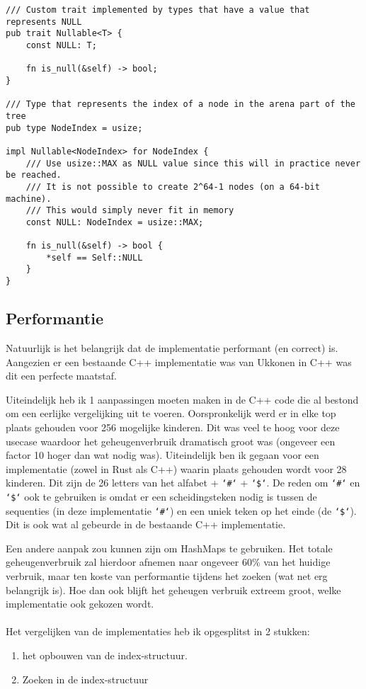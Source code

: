 \begin{verbatim}
/// Custom trait implemented by types that have a value that represents NULL
pub trait Nullable<T> {
    const NULL: T;

    fn is_null(&self) -> bool;
}

/// Type that represents the index of a node in the arena part of the tree
pub type NodeIndex = usize;

impl Nullable<NodeIndex> for NodeIndex {
    /// Use usize::MAX as NULL value since this will in practice never be reached.
    /// It is not possible to create 2^64-1 nodes (on a 64-bit machine).
    /// This would simply never fit in memory
    const NULL: NodeIndex = usize::MAX;

    fn is_null(&self) -> bool {
        *self == Self::NULL
    }
}
\end{verbatim}

\subsection{Performantie}\label{subsec:performantie}
Natuurlijk is het belangrijk dat de implementatie performant (en correct) is.
Aangezien er een bestaande C++ implementatie was van Ukkonen in C++ was dit een perfecte maatstaf.

Uiteindelijk heb ik 1 aanpassingen moeten maken in de C++ code die al bestond om een eerlijke vergelijking uit te voeren.
Oorspronkelijk werd er in elke top plaats gehouden voor 256 mogelijke kinderen.
Dit was veel te hoog voor deze usecase waardoor het geheugenverbruik dramatisch groot was (ongeveer een factor 10 hoger dan wat nodig was).
Uiteindelijk ben ik gegaan voor een implementatie (zowel in Rust als C++) waarin plaats gehouden wordt voor 28 kinderen.
Dit zijn de 26 letters van het alfabet + \texttt{`\#`} + \texttt{`\$`}.
De reden om \texttt{`\#`} en \texttt{`\$`} ook te gebruiken is omdat er een scheidingsteken nodig is tussen de sequenties (in deze implementatie \texttt{`\#`}) en een uniek teken op het einde (de \texttt{`\$`}).
Dit is ook wat al gebeurde in de bestaande C++ implementatie.

Een andere aanpak zou kunnen zijn om HashMaps te gebruiken.
Het totale geheugenverbruik zal hierdoor afnemen naar ongeveer 60\% van het huidige verbruik, maar ten koste van performantie tijdens het zoeken (wat net erg belangrijk is).
Hoe dan ook blijft het geheugen verbruik extreem groot, welke implementatie ook gekozen wordt.
\\ \\
Het vergelijken van de implementaties heb ik opgesplitst in 2 stukken:
\begin{enumerate}
    \item het opbouwen van de index-structuur.
    \item Zoeken in de index-structuur
\end{enumerate}

